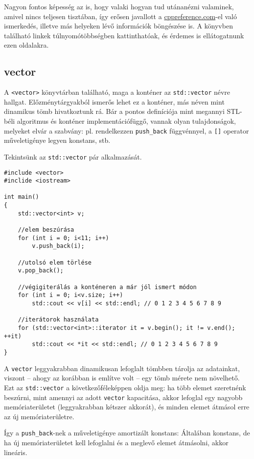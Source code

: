 \documentclass[../cpp_book/cpp_book.tex]{subfiles}
\begin{document}
	\begin{note}
		Nagyon fontos képesség az is, hogy valaki hogyan tud utánanézni valaminek, amivel nincs teljesen tisztában, így erősen javallott a \url{cppreference.com}-el való ismerkedés, illetve más helyeken lévő információk böngészése is. A könyvben található linkek túlnyomótöbbségben kattinthatóak, és érdemes is ellátogatnunk ezen oldalakra.
	\end{note}	
	\subsection{vector}
	A \texttt{<vector>} könyvtárban található, maga a konténer az \texttt{std::vector} névre hallgat. Előzménytárgyakból ismerős lehet ez a konténer, más néven mint dinamikus tömb hivatkoztunk rá. Bár a pontos definíciója mint megannyi STL-béli algoritmus és konténer implementációfüggő, vannak olyan tulajdonságok, melyeket elvár a szabvány: pl. rendelkezzen \texttt{push\_back} függvénnyel, a \texttt{[]} operator műveletigénye legyen konstans, stb.
	
	\medskip
	Tekintsünk az \texttt{std::vector} pár alkalmazását.
	\begin{lstlisting}
#include <vector>
#inclide <iostream>

int main()
{
	std::vector<int> v;
	
	//elem beszúrása
	for (int i = 0; i<11; i++)
		v.push_back(i);
		
	//utolsó elem törlése
	v.pop_back();
	
	//végigiterálás a konténeren a már jól ismert módon
	for (int i = 0; i<v.size; i++)
		std::cout << v[i] << std::endl; // 0 1 2 3 4 5 6 7 8 9
		
	//iterátorok használata
	for (std::vector<int>::iterator it = v.begin(); it != v.end(); ++it)
		std::cout << *it << std::endl; // 0 1 2 3 4 5 6 7 8 9
}
	\end{lstlisting}
	A \texttt{vector} leggyakrabban dinamikusan lefoglalt tömbben tárolja az adatainkat, viszont -- ahogy az korábban is említve volt -- egy tömb mérete nem növelhető. Ezt az \texttt{std::vector} a következőféleképpen oldja meg: ha több elemet szeretnénk beszúrni, mint amennyi az adott \texttt{vector} kapacitása, akkor lefoglal egy nagyobb memóriaterületet (leggyakrabban kétszer akkorát), és minden elemet átmásol erre az új memóriaterületre. 
	
	Így a \texttt{push\_back}-nek a műveletigénye amortizált konstans: Általában konstans, de ha új memóriaterületet kell lefoglalni és a meglevő elemet átmásolni, akkor lineáris.
	
\end{document}
